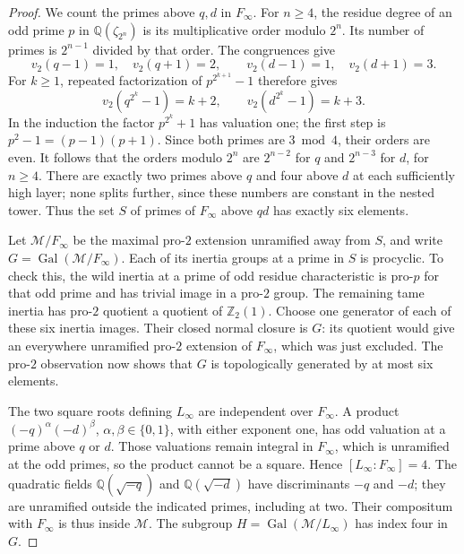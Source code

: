 \begin{proof}
We count the primes above \(q,d\) in \(F_\infty\).
For \(n\geq4\), the residue degree of an odd prime \(p\) in
\(\mathbb Q(\zeta_{2^n})\) is its multiplicative order modulo
\(2^n\). Its number of primes is \(2^{n-1}\) divided by that order.
The congruences give
\[
 v_2(q-1)=1,\quad v_2(q+1)=2,\qquad
 v_2(d-1)=1,\quad v_2(d+1)=3.
\]
For \(k\geq1\), repeated factorization of \(p^{2^{k+1}}-1\)
therefore gives
\[
 v_2(q^{2^k}-1)=k+2,\qquad
 v_2(d^{2^k}-1)=k+3.
\]
In the induction the factor \(p^{2^k}+1\) has valuation one;
the first step is \(p^2-1=(p-1)(p+1)\).
Since both primes are \(3\bmod4\), their orders are even.
It follows that the orders modulo \(2^n\) are
\(2^{n-2}\) for \(q\) and \(2^{n-3}\) for \(d\), for \(n\geq4\).
There are exactly two primes above \(q\) and four above \(d\)
at each sufficiently high layer; none splits further, since
these numbers are constant in the nested tower.
Thus the set \(S\) of primes of \(F_\infty\) above \(qd\) has
exactly six elements.

Let \(\mathcal M/F_\infty\) be the maximal pro-\(2\) extension
unramified away from \(S\), and write
\(G=\operatorname{Gal}(\mathcal M/F_\infty)\).
Each of its inertia groups at a prime in \(S\) is procyclic.
To check this, the wild inertia at a prime of odd residue
characteristic is pro-\(p\) for that odd prime and has trivial
image in a pro-\(2\) group. The remaining tame inertia has pro-\(2\)
quotient a quotient of \(\mathbb Z_2(1)\).
Choose one generator of each of these six inertia images.
Their closed normal closure is \(G\): its quotient would give
an everywhere unramified pro-\(2\) extension of \(F_\infty\),
which was just excluded.
The pro-\(2\) observation now shows that \(G\) is topologically
generated by at most six elements.

The two square roots defining \(L_\infty\) are independent over
\(F_\infty\). A product \((-q)^\alpha(-d)^\beta\),
\(\alpha,\beta\in\{0,1\}\), with either exponent one, has odd
valuation at a prime above \(q\) or \(d\).
Those valuations remain integral in \(F_\infty\), which is
unramified at the odd primes, so the product cannot be a square.
Hence \([L_\infty:F_\infty]=4\).
The quadratic fields \(\mathbb Q(\sqrt{-q})\) and
\(\mathbb Q(\sqrt{-d})\) have discriminants \(-q\) and \(-d\);
they are unramified outside the indicated primes, including at two.
Their compositum with \(F_\infty\) is thus inside \(\mathcal M\).
The subgroup \(H=\operatorname{Gal}(\mathcal M/L_\infty)\)
has index four in \(G\).


\end{proof}
